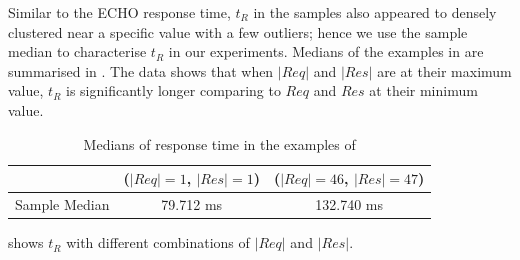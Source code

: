Similar to the ECHO response time, $t_R$ in the samples also appeared to densely clustered near a specific value with a few outliers; hence we use the sample median to characterise $t_R$ in our experiments. Medians of the examples in  are summarised in . The data shows that when $|Req|$ and $|Res|$ are at their maximum value, $t_R$ is significantly longer comparing to $Req$ and $Res$ at their minimum value.
 
\begin{table}
	\center
	\begin{tabular}{|c|c|c|}
		\hline
		 				&($|Req| = 1$, $|Res| = 1$) 	& ($|Req| = 46$, $|Res| = 47$) 	\\ \hline
		 Sample Median	&79.712 ms                  			& 132.740 ms                   			\\ \hline
	\end{tabular}

	\caption{Medians of response time in the examples of }
	\label{Tbl: Median of response times in examples}
\end{table}

 shows $t_R$ with different combinations of $|Req|$ and $|Res|$.

